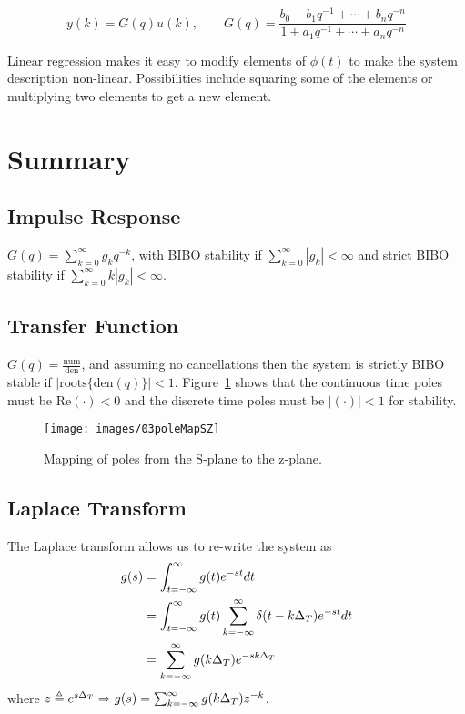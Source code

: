 \begin{equation*}
y(k) = G(q)u(k), \qquad G(q) = \frac{b_0+b_1 q^{-1}+\cdots+b_n q^{-n}}{1+a_1 q^{-1}+\cdots+a_n q^{-n}}
\end{equation*}

Linear regression makes it easy to modify elements of $\phi(t)$ to make the system description non-linear.
Possibilities include squaring some of the elements or multiplying two elements to get a new element.

\section{Summary}
\subsection{Impulse Response}
$G(q) = \sum_{k=0}^\infty g_k q^{-k}$, with BIBO stability if $\sum_{k=0}^\infty |g_k| < \infty$ and strict BIBO stability if $\sum_{k=0}^\infty k|g_k| < \infty$.

\subsection{Transfer Function}
$G(q) = \frac{\text{num}}{\text{den}}$, and assuming no cancellations then the system is strictly BIBO stable if $|\text{roots}\lbrace \text{den}(q)\rbrace|<1$.
Figure~\ref{fig:03poleMapSZ} shows that the continuous time poles must be $\text{Re}(\cdot) < 0$ and the discrete time poles must be $|(\cdot)| < 1$ for stability.
\begin{figure}[ht!]
\centering
\texttt{[image: images/03poleMapSZ]}
\caption{Mapping of poles from the S-plane to the z-plane.}%
\label{fig:03poleMapSZ}
\end{figure}

\subsection{Laplace Transform}
The Laplace transform allows us to re-write the system as
\begin{align*}
g(s) &= \int_{t=-\infty}^\infty g(t)e^{-st}dt \\
&= \int_{t=-\infty}^\infty g(t)\sum_{k=-\infty}^\infty \delta(t-k\Delta_T)e^{-st}dt \\
&= \sum_{k=-\infty}^\infty g(k\Delta_T)e^{-sk\Delta_T}
\end{align*}
where $z\triangleq e^{s\Delta_T} \Rightarrow g(s) = \sum_{k=-\infty}^\infty g(k\Delta_T)z^{-k}$.

